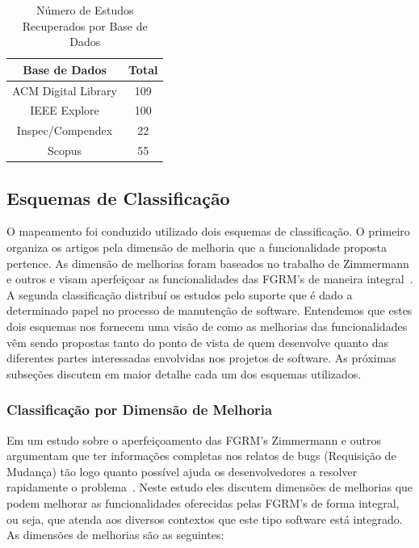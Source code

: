 \begin{table}[htb] \centering \caption{Número de Estudos Recuperados por Base de
		Dados}\label{tab:estudos-por-base-dados} \begin{tabular}{cc} \hline
		\textbf{Base de Dados} & \textbf{Total} \\ \hline ACM Digital Library
		& 109            \\ IEEE Explore           & 100            \\
		Inspec/Compendex       & 22             \\ Scopus                 & 55
		\\ \hline \end{tabular}

\end{table}

\subsection{Esquemas de Classificação}
\label{subsec:map-esquemas-classificacao}

O mapeamento foi conduzido utilizado dois esquemas de classificação. O primeiro
organiza os artigos pela dimensão de melhoria que a funcionalidade proposta
pertence. As dimensão de melhorias foram baseados no trabalho de Zimmermann e
outros e visam aperfeiçoar as funcionalidades das FGRM's de maneira
integral~\cite{zimmermann2009improving}. A segunda classificação distribuí os
estudos pelo suporte que é dado a determinado papel no processo de manutenção de
software. Entendemos que estes dois esquemas nos fornecem uma visão de como as
melhorias das funcionalidades vêm sendo propostas tanto do ponto de vista de
quem desenvolve quanto das diferentes partes interessadas envolvidas nos
projetos de software. As próximas subseções discutem em maior detalhe cada um
dos esquemas utilizados.

\subsubsection{Classificação por Dimensão de Melhoria}
\label{subsubsec:map-esquema-suporte-problema}

Em um estudo sobre o aperfeiçoamento das FGRM's Zimmermann e outros argumentam
que ter informações completas nos relatos de bugs (Requisição de Mudança) tão
logo quanto possível ajuda os desenvolvedores a resolver rapidamente o
problema~\cite{zimmermann2009improving}. Neste estudo eles discutem dimensões de
melhorias que podem melhorar as funcionalidades oferecidas pelas FGRM's de forma
integral, ou seja, que atenda aos diversos contextos que este tipo software está
integrado. As dimensões de melhorias são as seguintes:

